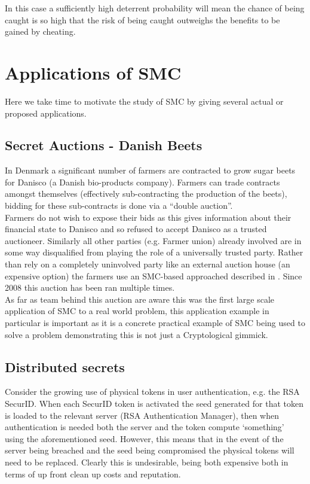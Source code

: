 \documentclass[ %
                    author={Nicholas Tutte},
                supervisor={Prof. Nigel Smart},
                    degree={MEng},
                     title={Secure Two Party Computation},
                  subtitle={A practical comparison of recent protocols},
                      type={Research - GG1K},
                      year={2015} ]{dissertation}
\begin{document}
					In this case a sufficiently high deterrent probability will mean the chance of being caught is so high that the risk of being caught outweighs the benefits to be gained by cheating.

		\section{Applications of SMC} \label{sub:Applications}
			Here we take time to motivate the study of SMC by giving several actual or proposed applications.

			\subsection{Secret Auctions - Danish Beets} \label{BeetsAuctionApplication}
				In Denmark a significant number of farmers are contracted to grow sugar beets for Danisco (a Danish bio-products company). Farmers can trade contracts amongst themselves (effectively sub-contracting the production of the beets), bidding for these sub-contracts is done via a ``double auction''.\\

				Farmers do not wish to expose their bids as this gives information about their financial state to Danisco and so refused to accept Danisco as a trusted auctioneer. Similarly all other parties (e.g. Farmer union) already involved are in some way disqualified from playing the role of a universally trusted party. Rather than rely on a completely uninvolved party like an external auction house (an expensive option) the farmers use an SMC-based approached described in \cite{SugarBeets}. Since 2008 this auction has been ran multiple times.\\

				As far as team behind this auction are aware this was the first large scale application of SMC to a real world problem, this application example in particular is important as it is a concrete practical example of SMC being used to solve a problem demonstrating this is not just a Cryptological gimmick.

			\subsection{Distributed secrets} \label{sub2:DistributedSecretApplication}
				Consider the growing use of physical tokens in user authentication, e.g. the RSA SecurID. When each SecurID token is activated the seed generated for that token is loaded to the relevant server (RSA Authentication Manager), then when authentication is needed both the server and the token compute `something' using the aforementioned seed. However, this means that in the event of the server being breached and the seed being compromised the physical tokens will need to be replaced. Clearly this is undesirable, being both expensive both in terms of up front clean up costs and reputation.\\
\end{document}
